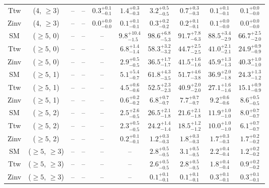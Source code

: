 \begin{table}[h!]
{\begin{tabular}{cccccccccc}
	Ttw & (4, $\ge3$) & -- & -- & $0.3^{+ 0.1 }_{- 0.1 }$ & $1.4^{+ 0.3 }_{- 0.3 }$ & $3.2^{+ 0.5 }_{- 0.5 }$ & $0.7^{+ 0.3 }_{- 0.3 }$ & $0.1^{+ 0.1 }_{- 0.1 }$ & $0.1^{+ 0.0 }_{- 0.0 }$ \\[0.5ex] 
	Zinv & (4, $\ge3$) & -- & -- & $0.0^{+ 0.0 }_{- 0.0 }$ & $0.1^{+ 0.1 }_{- 0.1 }$ & $0.3^{+ 0.2 }_{- 0.2 }$ & $0.2^{+ 0.1 }_{- 0.1 }$ & $0.1^{+ 0.0 }_{- 0.0 }$ & $0.0^{+ 0.0 }_{- 0.0 }$ \\[0.5ex] 
	SM & ($\ge5$, 0) & -- & -- & -- & $9.8^{+ 10.4 }_{- 1.5 }$ & $98.6^{+ 6.8 }_{- 5.3 }$ & $91.7^{+ 7.8 }_{- 6.3 }$ & $88.5^{+ 3.4 }_{- 2.9 }$ & $66.7^{+ 2.5 }_{- 2.0 }$ \\[0.5ex] 
	Ttw & ($\ge5$, 0) & -- & -- & -- & $6.8^{+ 1.4 }_{- 1.4 }$ & $58.3^{+ 3.2 }_{- 3.2 }$ & $44.7^{+ 2.5 }_{- 2.5 }$ & $41.0^{+ 2.1 }_{- 2.1 }$ & $24.9^{+ 0.9 }_{- 0.9 }$ \\[0.5ex] 
	Zinv & ($\ge5$, 0) & -- & -- & -- & $2.9^{+ 0.5 }_{- 0.5 }$ & $36.5^{+ 1.7 }_{- 1.7 }$ & $41.5^{+ 1.6 }_{- 1.6 }$ & $45.9^{+ 1.3 }_{- 1.3 }$ & $40.3^{+ 1.0 }_{- 1.0 }$ \\[0.5ex] 
	SM & ($\ge5$, 1) & -- & -- & -- & $5.1^{+ 5.4 }_{- 0.7 }$ & $61.8^{+ 4.3 }_{- 3.5 }$ & $51.7^{+ 4.6 }_{- 3.8 }$ & $36.9^{+ 2.0 }_{- 1.8 }$ & $24.3^{+ 1.3 }_{- 1.2 }$ \\[0.5ex] 
	Ttw & ($\ge5$, 1) & -- & -- & -- & $4.5^{+ 0.6 }_{- 0.6 }$ & $52.5^{+ 2.3 }_{- 2.3 }$ & $40.9^{+ 2.0 }_{- 2.0 }$ & $27.1^{+ 1.6 }_{- 1.6 }$ & $15.1^{+ 0.9 }_{- 0.9 }$ \\[0.5ex] 
	Zinv & ($\ge5$, 1) & -- & -- & -- & $0.6^{+ 0.2 }_{- 0.2 }$ & $6.8^{+ 0.7 }_{- 0.7 }$ & $7.7^{+ 0.7 }_{- 0.7 }$ & $9.2^{+ 0.6 }_{- 0.6 }$ & $8.6^{+ 0.5 }_{- 0.5 }$ \\[0.5ex] 
	SM & ($\ge5$, 2) & -- & -- & -- & $2.5^{+ 2.6 }_{- 0.5 }$ & $26.5^{+ 2.1 }_{- 1.8 }$ & $21.6^{+ 2.1 }_{- 1.8 }$ & $11.9^{+ 1.0 }_{- 1.0 }$ & $8.0^{+ 0.7 }_{- 0.7 }$ \\[0.5ex] 
	Ttw & ($\ge5$, 2) & -- & -- & -- & $2.3^{+ 0.5 }_{- 0.5 }$ & $24.2^{+ 1.4 }_{- 1.4 }$ & $18.5^{+ 1.2 }_{- 1.2 }$ & $10.0^{+ 1.0 }_{- 1.0 }$ & $6.1^{+ 0.7 }_{- 0.7 }$ \\[0.5ex] 
	Zinv & ($\ge5$, 2) & -- & -- & -- & $0.2^{+ 0.1 }_{- 0.1 }$ & $1.2^{+ 0.3 }_{- 0.3 }$ & $1.8^{+ 0.3 }_{- 0.3 }$ & $1.7^{+ 0.3 }_{- 0.3 }$ & $1.7^{+ 0.2 }_{- 0.2 }$ \\[0.5ex] 
	SM & ($\ge5$, $\ge3$) & -- & -- & -- & -- & $2.8^{+ 0.5 }_{- 0.5 }$ & $3.1^{+ 0.5 }_{- 0.5 }$ & $2.2^{+ 0.4 }_{- 0.4 }$ & $1.2^{+ 0.2 }_{- 0.2 }$ \\[0.5ex] 
	Ttw & ($\ge5$, $\ge3$) & -- & -- & -- & -- & $2.6^{+ 0.5 }_{- 0.5 }$ & $2.8^{+ 0.5 }_{- 0.5 }$ & $1.8^{+ 0.4 }_{- 0.4 }$ & $0.9^{+ 0.2 }_{- 0.2 }$ \\[0.5ex] 
	Zinv & ($\ge5$, $\ge3$) & -- & -- & -- & -- & $0.1^{+ 0.1 }_{- 0.1 }$ & $0.1^{+ 0.1 }_{- 0.1 }$ & $0.3^{+ 0.1 }_{- 0.1 }$ & $0.3^{+ 0.1 }_{- 0.1 }$ \\[0.5ex] 
	\hline
	\hline
\end{tabular}}
\end{table}
